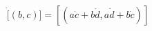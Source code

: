 \documentclass[preview]{standalone}
\begin{document}
\begin{align*}
[(a, b)] \dot [(b, c)] = [(a \dot c + b \dot d, a \dot d + b \dot c)]
\end{align*}
\end{document}
